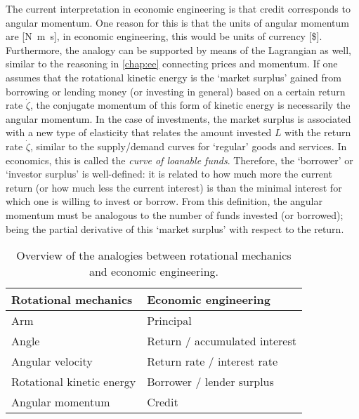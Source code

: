 The current interpretation in economic engineering is that credit corresponds to angular momentum. One reason for this is that the units of angular momentum are [\si{\newton \meter \second}], in economic engineering, this would be units of currency [\$]. Furthermore, the analogy can be supported by means of the Lagrangian as well, similar to the reasoning in \cref{chap:ee} connecting prices and momentum. If one assumes that the rotational kinetic energy is the `market surplus' gained from borrowing or lending money (or investing in general) based on a certain return rate $\dot{\zeta}$, the conjugate momentum of this form of kinetic energy is necessarily the angular momentum. In the case of investments, the market surplus is associated with a new type of elasticity that relates the amount invested $L$ with the return rate $\dot{\zeta}$, similar to the supply/demand curves for `regular' goods and services. In economics, this is called the \emph{curve of loanable funds}. Therefore, the `borrower' or `investor surplus' is well-defined: it is related to how much more the current return (or how much less the current interest) is than the minimal interest for which one is willing to invest or borrow. From this definition, the angular momentum must be analogous to the number of funds invested (or borrowed); being the partial derivative of this `market surplus' with respect to the return. 
\begin{table}[h]
    \centering
    \caption{Overview of the analogies between rotational mechanics and economic engineering.}
    \begin{tabular}{ll}
        \toprule
         \textbf{Rotational mechanics} & \textbf{Economic engineering} \\
         \midrule
         Arm & Principal \\
         Angle & Return / accumulated interest \\
         Angular velocity & Return rate / interest rate \\
         Rotational kinetic energy & Borrower / lender surplus \\
         Angular momentum & Credit \\
         \bottomrule
    \end{tabular}
    \label{tab:my_label}
\end{table}

